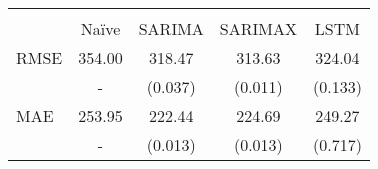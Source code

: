 \begin{tabular}{lcccc}
\hline\hline \\ [-1.8ex]
 & Naïve & SARIMA & SARIMAX & LSTM \\ 
 \hline 
RMSE & 354.00 & 318.47 & 313.63 & 324.04 \\ 
 & - & (0.037) & (0.011) & (0.133) \\ 
MAE & 253.95 & 222.44 & 224.69 & 249.27 \\ 
 & - & (0.013) & (0.013) & (0.717) \\ 
\hline\hline
\end{tabular}